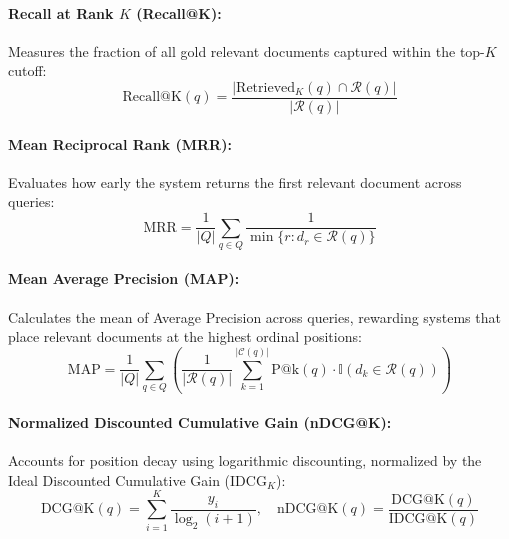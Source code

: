 \paragraph{Recall at Rank $K$ (Recall@K):}
Measures the fraction of all gold relevant documents captured within the top-$K$ cutoff:
\begin{equation}
    \text{Recall@K}(q) = \frac{|\text{Retrieved}_K(q) \cap \mathcal{R}(q)|}{|\mathcal{R}(q)|}
\end{equation}

\paragraph{Mean Reciprocal Rank (MRR):}
Evaluates how early the system returns the first relevant document across queries:
\begin{equation}
    \text{MRR} = \frac{1}{|Q|} \sum_{q \in Q} \frac{1}{\min \{r : d_r \in \mathcal{R}(q)\}}
\end{equation}

\paragraph{Mean Average Precision (MAP):}
Calculates the mean of Average Precision across queries, rewarding systems that place relevant documents at the highest ordinal positions:
\begin{equation}
    \text{MAP} = \frac{1}{|Q|} \sum_{q \in Q} \left( \frac{1}{|\mathcal{R}(q)|} \sum_{k=1}^{|\mathcal{C}(q)|} \text{P@k}(q) \cdot \mathbb{I}(d_k \in \mathcal{R}(q)) \right)
\end{equation}

\paragraph{Normalized Discounted Cumulative Gain (nDCG@K):}
Accounts for position decay using logarithmic discounting, normalized by the Ideal Discounted Cumulative Gain ($\text{IDCG}_K$):
\begin{equation}
    \text{DCG@K}(q) = \sum_{i=1}^K \frac{y_i}{\log_2(i + 1)}, \quad \text{nDCG@K}(q) = \frac{\text{DCG@K}(q)}{\text{IDCG@K}(q)}
\end{equation}

